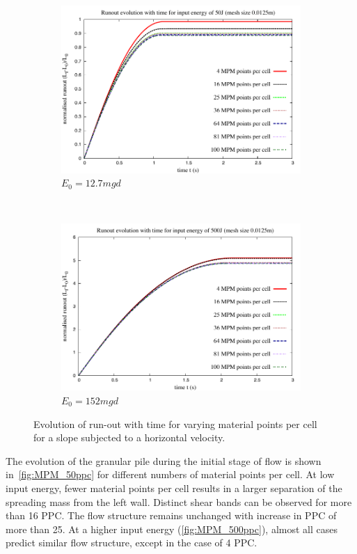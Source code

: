 \begin{figure}[tbhp]
\centering
\begin{subfigure}[b]{0.9\textwidth}
\includegraphics[width=\textwidth]{Runout_50}
\caption{$E_0=12.7mgd$}
\label{fig:Runout_50}
\end{subfigure}
\\
\begin{subfigure}[b]{0.9\textwidth}
\centering
\includegraphics[width=\textwidth]{Runout_500}
\caption{$E_0=152mgd$}
\label{fig:Runout_500}
\end{subfigure}
\caption{Evolution of run-out with time for varying material points per cell 
for a slope subjected to a horizontal velocity.}
\label{fig:Runout_MPM}
\end{figure}

The evolution of the granular pile during the initial stage of flow is shown 
in~\cref{fig:MPM_50ppc} for different numbers of material points per cell. At 
low input energy, fewer material points per cell results in a larger separation 
of the spreading mass from the left wall. Distinct shear bands can be observed 
for more than 16 PPC. The flow structure remains unchanged with increase in PPC 
of more than 25. At a higher input energy
(\cref{fig:MPM_500ppc}), almost all cases predict similar flow structure, 
except in the case of 4 PPC.

